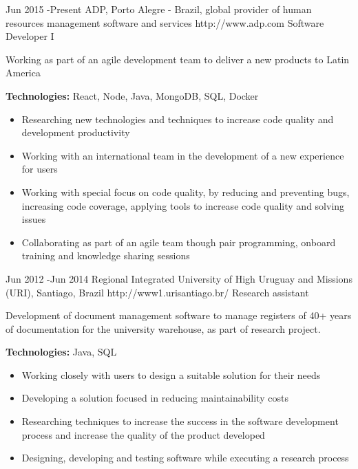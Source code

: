 \documentclass[10pt]{article} %
\begin{document}
\begin{job}
{Jun 2015 -}{Present}
{ADP, Porto Alegre - Brazil, global provider of human resources management software and services}
{http://www.adp.com}
{Software Developer I}
{Working as part of an agile development team to deliver a new products to Latin America \\
\rule{0mm}{5mm}\textbf{Technologies:} React, Node, Java, MongoDB, SQL, Docker}

\begin{itemize}
\addtolength{\itemindent}{1,5cm}
  \item Researching new technologies and techniques to increase code quality and development productivity
  \item Working with an international team in the development of a new experience for users
  \item Working with special focus on code quality, by reducing and preventing bugs, increasing code coverage, applying tools to increase code quality and solving issues
  \item Collaborating as part of an agile team though pair programming, onboard training and knowledge sharing sessions
\end{itemize}

\vspace{5mm} 
\end{job}

\begin{job}
{Jun 2012 -}{Jun 2014}
{Regional Integrated University of High Uruguay and Missions (URI), Santiago, Brazil}
{http://www1.urisantiago.br/}
{Research assistant}
{Development of document management software to manage registers of 40+ years of documentation for the university warehouse, as part of research project. \\
\rule{0mm}{5mm}\textbf{Technologies:} Java, SQL}

\begin{itemize}
\addtolength{\itemindent}{1,5cm}
  \item Working closely with users to design a suitable solution for their needs
  \item Developing a solution focused in reducing maintainability costs
  \item Researching techniques to increase the success in the software development process and increase the quality of the product developed
  \item Designing, developing and testing software while executing a research process
\end{itemize}

\vspace{5mm} 
\end{job}
\end{document}
